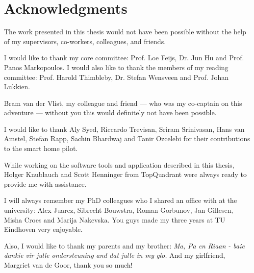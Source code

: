 \cleardoublepage




\bigskip

\begingroup
\let\clearpage\relax
\let\cleardoublepage\relax
\let\cleardoublepage\relax
\chapter*{Acknowledgments}
The work presented in this thesis would not have been possible without the help of my supervisors, co-workers, colleagues, and friends.

I would like to thank my core committee: Prof. Loe Feijs, Dr. Jun Hu and Prof. Panos Markopoulos. I would also like to thank the members of my reading committee: Prof. Harold Thimbleby, Dr. Stefan Wensveen and Prof. Johan Lukkien.

Bram van der Vlist, my colleague and friend --- who was my co-captain on this adventure --- without you this would definitely not have been possible.

I would like to thank Aly Syed, Riccardo Trevisan, Sriram Srinivasan, Hans van Amstel, Stefan Rapp, Sachin Bhardwaj and Tanir Ozcelebi for their contributions to the smart home pilot.

While working on the software tools and application described in this thesis, Holger Knublauch and Scott Henninger from TopQuadrant were always ready to provide me with assistance. 

I will always remember my PhD colleagues who I shared an office with at the university: Alex Juarez, Sibrecht Bouwstra, Roman Gorbunov, Jan Gillesen, Misha Croes and Marija Nakevska. You guys made my three years at TU Eindhoven very enjoyable.

Also, I would like to thank my parents and my brother: \emph{Ma, Pa en Riaan - baie dankie vir julle ondersteuning and dat julle in my glo.} And my girlfriend, Margriet van de Goor, thank you so much!

\endgroup



